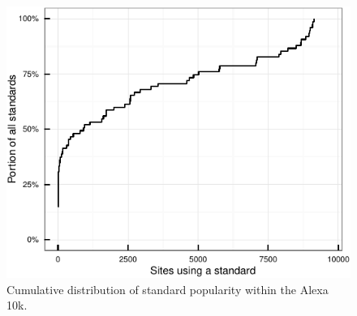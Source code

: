 \begin{figure}[ht]
  \centering
  \includegraphics[width=.5\textwidth]{figures/feature_popularity.pdf}
  \caption{Cumulative distribution of standard popularity within the Alexa 10k.}
  \label{fig:popcdf}
\end{figure}